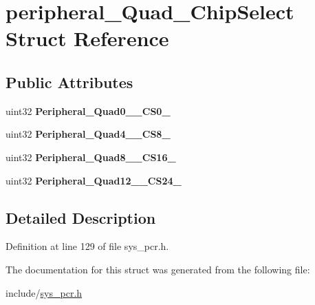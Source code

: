\hypertarget{structperipheral__Quad__ChipSelect}{}\section{peripheral\+\_\+\+Quad\+\_\+\+Chip\+Select Struct Reference}
\label{structperipheral__Quad__ChipSelect}
\subsection*{Public Attributes}
\begin{DoxyCompactItemize}
\item 
\mbox{\label{structperipheral__Quad__ChipSelect_aae4b7477429aad725b9242f59d5ba579}} 
uint32 {\bfseries Peripheral\+\_\+\+Quad0\+\_\+\_\+\+C\+S0\+\_}
\item 
\mbox{\label{structperipheral__Quad__ChipSelect_ae9a4606e7dec5b43dd6681c83f1221ca}} 
uint32 {\bfseries Peripheral\+\_\+\+Quad4\+\_\+\_\+\+C\+S8\+\_}
\item 
\mbox{\label{structperipheral__Quad__ChipSelect_a2bdbfe7704169360c0c19cf1a549e052}} 
uint32 {\bfseries Peripheral\+\_\+\+Quad8\+\_\+\_\+\+C\+S16\+\_}
\item 
\mbox{\label{structperipheral__Quad__ChipSelect_a070adffdc60b6c732cebc09a2c259753}} 
uint32 {\bfseries Peripheral\+\_\+\+Quad12\+\_\+\_\+\+C\+S24\+\_}
\end{DoxyCompactItemize}


\subsection{Detailed Description}


Definition at line 129 of file sys\+\_\+pcr.\+h.



The documentation for this struct was generated from the following file\+:\begin{DoxyCompactItemize}
\item 
include/\mbox{\hyperlink{sys__pcr_8h}{sys\+\_\+pcr.\+h}}\end{DoxyCompactItemize}
